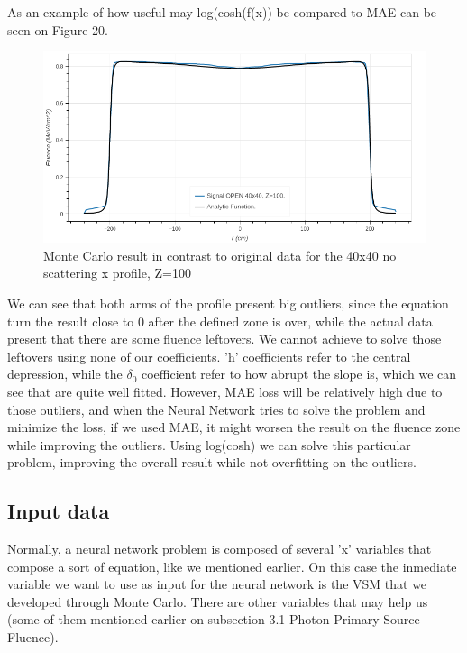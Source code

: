 \documentclass[openany]{article}
\begin{document}
As an example of how useful may log(cosh(f(x)) be compared to MAE can be seen on Figure 20.

\begin{figure}[!h]
    \centering
    \includegraphics[width=\textwidth]{Outlier example.png}
    \caption{Monte Carlo result in contrast to original data for the 40x40 no scattering x profile, Z=100}
    \label{fig:my_label}
\end{figure}

We can see that both arms of the profile present big outliers, since the equation turn the result close to 0 after the defined zone is over, while the actual data present that there are some fluence leftovers. We cannot achieve to solve those leftovers using none of our coefficients. 'h' coefficients refer to the central depression, while the \(\delta_0\) coefficient refer to how abrupt the slope is, which we can see that are quite well fitted. However, MAE loss will be relatively high due to those outliers, and when the Neural Network tries to solve the problem and minimize the loss, if we used MAE, it might worsen the result on the fluence zone while improving the outliers. Using log(cosh) we can solve this particular problem, improving the overall result while not overfitting on the outliers. 

\newpage 

\subsection{Input data}

Normally, a neural network problem is composed of several 'x' variables that compose a sort of equation, like we mentioned earlier. On this case the inmediate variable we want to use as input for the neural network is the VSM that we developed through Monte Carlo. There are other variables that may help us (some of them mentioned earlier on subsection 3.1 Photon Primary Source Fluence).
\end{document}

